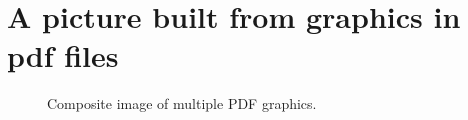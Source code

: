 \section{A picture built from graphics in pdf files}

\begin{figure}[htbp]
    \centering
    \begin{tikzpicture}





    \end{tikzpicture}
    \caption{Composite image of multiple PDF graphics.}
    \label{fig:composite-image}
\end{figure}


